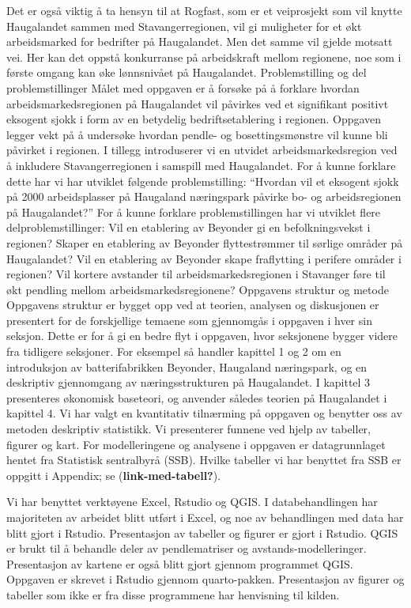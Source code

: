 \documentclass[
]{article}
\begin{document}
Det er også viktig å ta hensyn til at Rogfast, som er et veiprosjekt som
vil knytte Haugalandet sammen med Stavangerregionen, vil gi muligheter
for et økt arbeidsmarked for bedrifter på Haugalandet. Men det samme vil
gjelde motsatt vei. Her kan det oppstå konkurranse på arbeidskraft
mellom regionene, noe som i første omgang kan øke lønnsnivået på
Haugalandet. Problemstilling og del problemstillinger Målet med oppgaven
er å forsøke på å forklare hvordan arbeidsmarkedsregionen på Haugalandet
vil påvirkes ved et signifikant positivt eksogent sjokk i form av en
betydelig bedriftsetablering i regionen. Oppgaven legger vekt på å
undersøke hvordan pendle- og bosettingsmønstre vil kunne bli påvirket i
regionen. I tillegg introduserer vi en utvidet arbeidsmarkedsregion ved
å inkludere Stavangerregionen i samspill med Haugalandet. For å kunne
forklare dette har vi har utviklet følgende problemstilling: ``Hvordan
vil et eksogent sjokk på 2000 arbeidsplasser på Haugaland næringspark
påvirke bo- og arbeidsregionen på Haugalandet?'' For å kunne forklare
problemstillingen har vi utviklet flere delproblemstillinger: Vil en
etablering av Beyonder gi en befolkningsvekst i regionen? Skaper en
etablering av Beyonder flyttestrømmer til sørlige områder på
Haugalandet? Vil en etablering av Beyonder skape fraflytting i perifere
områder i regionen? Vil kortere avstander til arbeidsmarkedsregionen i
Stavanger føre til økt pendling mellom arbeidsmarkedsregionene?
Oppgavens struktur og metode Oppgavens struktur er bygget opp ved at
teorien, analysen og diskusjonen er presentert for de forskjellige
temaene som gjennomgås i oppgaven i hver sin seksjon. Dette er for å gi
en bedre flyt i oppgaven, hvor seksjonene bygger videre fra tidligere
seksjoner. For eksempel så handler kapittel 1 og 2 om en introduksjon av
batterifabrikken Beyonder, Haugaland næringspark, og en deskriptiv
gjennomgang av næringsstrukturen på Haugalandet. I kapittel 3
presenteres økonomisk baseteori, og anvender således teorien på
Haugalandet i kapittel 4. Vi har valgt en kvantitativ tilnærming på
oppgaven og benytter oss av metoden deskriptiv statistikk. Vi
presenterer funnene ved hjelp av tabeller, figurer og kart. For
modelleringene og analysene i oppgaven er datagrunnlaget hentet fra
Statistisk sentralbyrå (SSB). Hvilke tabeller vi har benyttet fra SSB er
oppgitt i Appendix; se (\textbf{link-med-tabell?}).

Vi har benyttet verktøyene Excel, Rstudio og QGIS. I databehandlingen
har majoriteten av arbeidet blitt utført i Excel, og noe av behandlingen
med data har blitt gjort i Rstudio. Presentasjon av tabeller og figurer
er gjort i Rstudio. QGIS er brukt til å behandle deler av pendlematriser
og avstands-modelleringer. Presentasjon av kartene er også blitt gjort
gjennom programmet QGIS. Oppgaven er skrevet i Rstudio gjennom
quarto-pakken. Presentasjon av figurer og tabeller som ikke er fra disse
programmene har henvisning til kilden.
\end{document}
